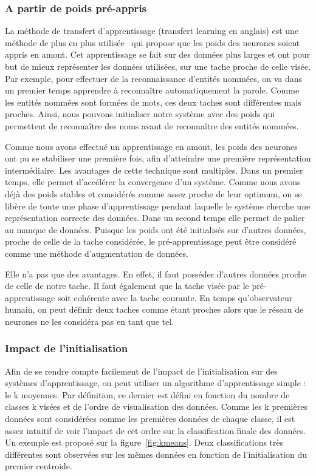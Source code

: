 \subsubsection{A partir de poids pré-appris}
La méthode de transfert d'apprentissage (transfert learning en anglais) est une méthode de plus en plus utilisée~\cite{Pan2010,Weiss2016} qui propose que les poids des neurones soient appris en amont. Cet apprentissage se fait sur des données plus larges et ont pour but de mieux représenter les données utilisées, sur une tache proche de celle visée. Par exemple, pour effectuer de la reconnaissance d'entités nommées, on va dans un premier temps apprendre à reconnaître automatiquement la parole. Comme les entités nommées sont formées de mots, ces deux taches sont différentes mais proches. Ainsi, nous pouvons initialiser notre système avec des poids qui permettent de reconnaître des noms avant de reconnaître des entités nommées.

Comme nous avons effectué un apprentissage en amont, les poids des neurones ont pu se stabiliser une première fois, afin d'atteindre une première représentation intermédiaire. Les avantages de cette technique sont multiples. Dans un premier temps, elle permet d’accélérer la convergence d'un système. Comme nous avons déjà des poids stables et considérés comme assez proche de leur optimum, on se libère de toute une phase d'apprentissage pendant laquelle le système cherche une représentation correcte des données. Dans un second temps elle permet de palier au manque de données. Puisque les poids ont été initialisés sur d'autres données, proche de celle de la tache considérée, le pré-apprentissage peut être considéré comme une méthode d'augmentation de données.

Elle n'a pas que des avantages. En effet, il faut posséder d'autres données proche de celle de notre tache. Il faut également que la tache visée par le pré-apprentissage soit cohérente avec la tache courante. En temps qu'observateur humain, on peut définir deux taches comme étant proches alors que le réseau de neurones ne les considéra pas en tant que tel.

\subsubsection{Impact de l'initialisation}
Afin de se rendre compte facilement de l'impact de l’initialisation sur des systèmes d'apprentissage, on peut utiliser un algorithme d'apprentissage simple : le k moyennes. Par définition, ce dernier est défini en fonction du nombre de classes k visées et de l'ordre de visualisation des données. Comme les k premières données sont considérées comme les premières données de chaque classe, il est assez intuitif de voir l'impact de cet ordre sur la classification finale des données. Un exemple est proposé sur la figure~\ref{fig:kmeans}. Deux classifications très différentes sont observées sur les mêmes données en fonction de l’initialisation du premier centroide.



